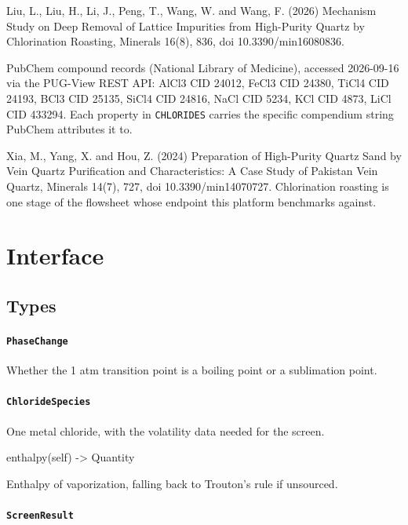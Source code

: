 \documentclass[10pt,a4paper,twoside]{report}
\begin{document}
Liu, L., Liu, H., Li, J., Peng, T., Wang, W. and Wang, F. (2026) Mechanism Study on Deep Removal of Lattice Impurities from High-Purity Quartz by Chlorination Roasting, Minerals 16(8), 836, doi 10.3390/min16080836.

PubChem compound records (National Library of Medicine), accessed 2026-09-16 via the PUG-View REST API: AlCl3 CID 24012, FeCl3 CID 24380, TiCl4 CID 24193, BCl3 CID 25135, SiCl4 CID 24816, NaCl CID 5234, KCl CID 4873, LiCl CID 433294. Each property in \texttt{CHLORIDES} carries the specific compendium string PubChem attributes it to.

Xia, M., Yang, X. and Hou, Z. (2024) Preparation of High-Purity Quartz Sand by Vein Quartz Purification and Characteristics: A Case Study of Pakistan Vein Quartz, Minerals 14(7), 727, doi 10.3390/min14070727. Chlorination roasting is one stage of the flowsheet whose endpoint this platform benchmarks against.

\section{Interface}

\subsection*{Types}

\paragraph{\texttt{PhaseChange}}

Whether the 1 atm transition point is a boiling point or a sublimation point.

\paragraph{\texttt{ChlorideSpecies}}

One metal chloride, with the volatility data needed for the screen.

\begin{verbatimsmall}
enthalpy(self) -> Quantity
\end{verbatimsmall}

Enthalpy of vaporization, falling back to Trouton's rule if unsourced.

\paragraph{\texttt{ScreenResult}}
\end{document}
